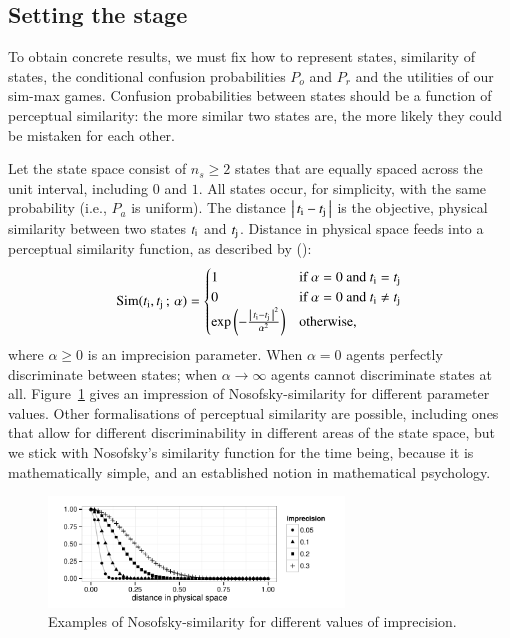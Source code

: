 \documentclass[11pt,english]{article}
\newcommand{\imprecision}{\ensuremath{\alpha}} %
\newcommand{\ns}{\ensuremath{n_s}} %
\newcommand{\similarity}{\ensuremath{\mathrm{Sim}}} %
\numberwithin{equation}{section}
\newcommand{\citetbjps}[1]{\citeauthor{#1} (\citeyear{#1})}
\begin{document}
\subsection{Setting the stage}
\label{sec:setting-stage}

To obtain concrete results, we must fix how to represent states, similarity of states, the
conditional confusion probabilities $P_o$ and $P_r$ and the utilities of our sim-max
games. Confusion probabilities between states should be a function of perceptual similarity:
the more similar two states are, the more likely they could be mistaken for each other. 

Let the state space consist of $\ns \ge 2$ states that are equally spaced across the unit
interval, including $0$ and $1$. All states occur, for simplicity, with the same probability
(i.e., $P_a$ is uniform).  The distance $\left \lvert \, t_{\mathrm{i}} - t_{\mathrm{j}} \, \right\rvert$ is the objective,
physical similarity between two states $t_{\mathrm{i}}$ and $t_{\mathrm{j}}$. Distance in physical
space feeds into a perceptual similarity function, as described by
\citetbjps{Nosofsky1986:Attention-Simil}:
\begin{align*}
  \similarity(\mystate{i}, \mystate{j} \myts ; \myts \imprecision) =
      \begin{cases}
    1 & \textrm{if } \imprecision = 0 \textrm{ and } \mystate{i} = \mystate{j} \\
    0 & \textrm{if } \imprecision = 0 \textrm{ and } \mystate{i} \neq \mystate{j} \\
 \expo \left ( -  \frac{\card{\mystate{i} - \mystate{j}}^2}{ \imprecision^2} \right ) & \textrm{otherwise,} \\
    \end{cases}
\end{align*}
where $\imprecision \ge 0$ is an imprecision parameter. When $\imprecision=0$ agents perfectly
discriminate between states; when $\imprecision \rightarrow \infty$ agents cannot discriminate
states at all. Figure~\ref{fig:NosofskySim} gives an impression of Nosofsky-similarity for
different parameter values. Other formalisations of perceptual similarity are possible,
including ones that allow for different discriminability in different areas of the state space,
but we stick with Nosofsky's similarity function for the time being, because it is
mathematically simple, and an established notion in mathematical psychology.

\begin{figure}
  \centering

  \includegraphics[width=0.7\textwidth]{plots/NosofskySim.pdf}

  \caption{Examples of Nosofsky-similarity for different values of
    imprecision.}
  \label{fig:NosofskySim}
\end{figure}
\end{document}
